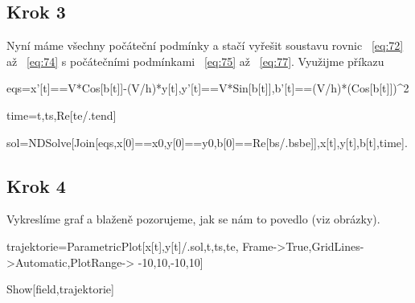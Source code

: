 \documentclass[reqno, a4paper]{amsart}
\begin{document}
\subsection*{Krok 3}
Nyní máme všechny počáteční podmínky a stačí vyřešit soustavu rovnic ~\eqref{eq:72} až ~\eqref{eq:74} s počátečními podmínkami ~\eqref{eq:75} až ~\eqref{eq:77}. Využijme příkazu
\begin{verbatim*}
	eqs={x'[t]==V*Cos[b[t]]-(V/h)*y[t],y'[t]==V*Sin[b[t]],b'[t]==(V/h)*(Cos[b[t]])^2}
	
	time={t,ts,Re[te/.tend]}
	
	sol=NDSolve[Join[eqs,{x[0]==x0,y[0]==y0,b[0]==Re[bs/.bsbe]}],{x[t],y[t],b[t]},time].
\end{verbatim*}
\subsection*{Krok 4}
Vykreslíme graf a blaženě pozorujeme, jak se nám to povedlo (viz obrázky).
\begin{verbatim*}
	trajektorie=ParametricPlot[{x[t],y[t]}/.sol,{t,ts,te}, Frame->True,GridLines->Automatic,PlotRange->
	{{-10,10},{-10,10}}]
	
	Show[field,trajektorie]
\end{verbatim*}
\end{document}
